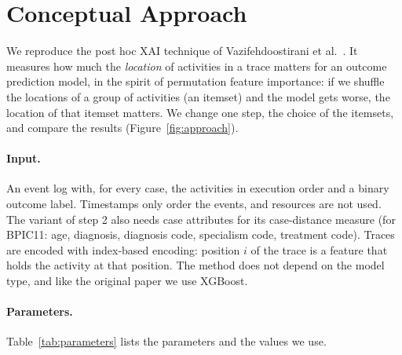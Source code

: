 \documentclass{article}
\begin{document}
\section{Conceptual Approach}
\label{sec:approach}

We reproduce the post hoc XAI technique of Vazifehdoostirani et al.~\cite{vazifehdoostirani2024}. It measures how much the \emph{location} of activities in a trace matters for an outcome prediction model, in the spirit of permutation feature importance: if we shuffle the locations of a group of activities (an itemset) and the model gets worse, the location of that itemset matters. We change one step, the choice of the itemsets, and compare the results (Figure~\ref{fig:approach}).

\paragraph{Input.}
An event log with, for every case, the activities in execution order and a binary outcome label. Timestamps only order the events, and resources are not used. The variant of step 2 also needs case attributes for its case-distance measure (for BPIC11: age, diagnosis, diagnosis code, specialism code, treatment code). Traces are encoded with index-based encoding: position $i$ of the trace is a feature that holds the activity at that position. The method does not depend on the model type, and like the original paper we use XGBoost.

\paragraph{Parameters.}
Table~\ref{tab:parameters} lists the parameters and the values we use.
\end{document}
